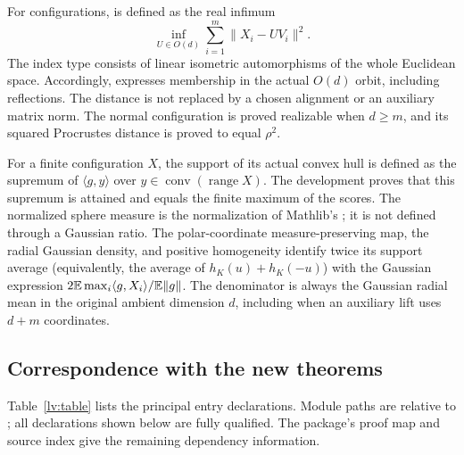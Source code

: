 For configurations,  is defined as the
real infimum
\[
 \inf_{U\in O(d)}\sum_{i=1}^m\|X_i-U V_i\|^2.
\]
The index type consists of linear isometric automorphisms of the whole
Euclidean space.  Accordingly,  expresses
membership in the actual $O(d)$ orbit, including reflections.  The
distance is not replaced by a chosen alignment or an auxiliary matrix
norm.  The normal configuration is proved realizable when $d\geq m$,
and its squared Procrustes distance is proved to equal $\rho^2$.

For a finite configuration $X$, the support of its actual convex hull is
defined as the supremum of $\langle g,y\rangle$ over
$y\in\operatorname{conv}(\operatorname{range}X)$.  The development proves
that this supremum is attained and equals the finite maximum of the
scores.  The normalized sphere measure is the normalization of
Mathlib's ; it is not defined through a Gaussian
ratio.  The polar-coordinate measure-preserving map, the radial Gaussian
density, and positive homogeneity identify twice its support average (equivalently, the average of
$h_K(u)+h_K(-u)$) with the
Gaussian expression $2\mathbb E\max_i\langle g,X_i\rangle/\mathbb E\|g\|$.
The denominator is always the Gaussian radial mean in the original
ambient dimension $d$, including when an auxiliary lift uses $d+m$
coordinates.

\subsection{Correspondence with the new theorems}\label{lv:map}
Table~\ref{lv:table} lists the principal entry declarations.  Module paths
are relative to ; all declarations shown below are
fully qualified.  The package's proof map and source index give the
remaining dependency information.

